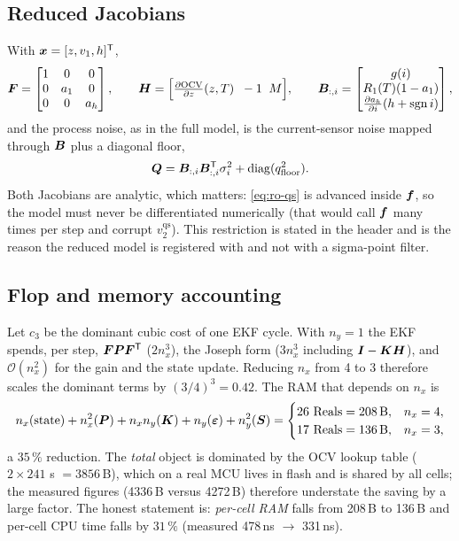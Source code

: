 \subsection{Reduced Jacobians}
With $\bm{x}=[z,v_1,h]^{\mathsf{T}}$,
\begin{equation}
\bm{F}=\begin{bmatrix}1&0&0\\0&a_1&0\\0&0&a_h\end{bmatrix},
\qquad
\bm{H}=\Big[\tfrac{\partial\mathrm{OCV}}{\partial z}(z,T)\;\;-1\;\;M\Big],
\qquad
\bm{B}_{:,i}=\begin{bmatrix}g(i)\\R_1(T)(1-a_1)\\ \tfrac{\partial a_h}{\partial i}(h+\operatorname{sgn} i)\end{bmatrix},
\label{eq:ro-jac}
\end{equation}
and the process noise, as in the full model, is the current-sensor noise mapped through $\bm{B}$ plus
a diagonal floor,
\begin{equation}
\bm{Q}=\bm{B}_{:,i}\bm{B}_{:,i}^{\mathsf{T}}\sigma_i^2+\operatorname{diag}(q_{\mathrm{floor}}^2).
\label{eq:ro-Q}
\end{equation}
Both Jacobians are analytic, which matters: \eqref{eq:ro-qs} is advanced inside $\bm{f}$, so the model
must never be differentiated numerically (that would call $\bm{f}$ many times per step and corrupt
$v^{\mathrm{qs}}_2$).  This restriction is stated in the header and is the reason the reduced model
is registered with  and not with a sigma-point filter.

\subsection{Flop and memory accounting}
Let $c_3$ be the dominant cubic cost of one EKF cycle.  With $n_y=1$ the EKF spends, per step,
$\bm{F}\bm{P}\bm{F}^{\mathsf{T}}$ ($2n_x^3$), the Joseph form ($3n_x^3$ including $\bm{I}-\bm{K}\bm{H}$), and
$\mathcal{O}(n_x^2)$ for the gain and the state update.  Reducing $n_x$ from 4 to 3 therefore scales
the dominant terms by $(3/4)^3=0.42$.  The RAM that depends on $n_x$ is
\begin{equation}
n_x(\text{state})+n_x^2(\bm{P})+n_x n_y(\bm{K})+n_y(\bm{\varepsilon})+n_y^2(\bm{S})
=\begin{cases}26\ \text{Reals}=208\,\text{B}, & n_x=4,\\
              17\ \text{Reals}=136\,\text{B}, & n_x=3,\end{cases}
\label{eq:ro-mem}
\end{equation}
a $35\,\%$ reduction.  The \emph{total} object is dominated by the OCV lookup table
($2\times241$ s $=3856$\,B), which on a real MCU lives in flash and is shared by all
cells; the measured  figures (4336\,B versus 4272\,B) therefore understate the saving
by a large factor.  The honest statement is: \emph{per-cell RAM} falls from 208\,B to 136\,B and
per-cell CPU time falls by $31\,\%$ (measured 478\,ns $\to$ 331\,ns).

